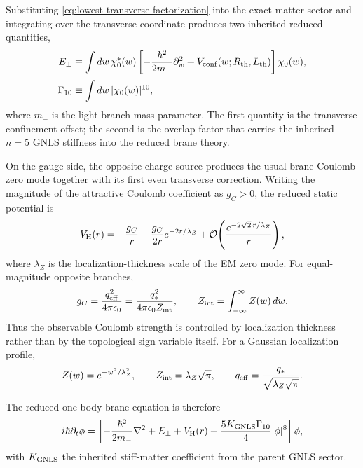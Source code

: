\documentclass[11pt]{article}
\theoremstyle{plain}
\theoremstyle{definition}
\theoremstyle{remark}
\newcommand{\Rth}{R_{\mathrm{th}}}
\newcommand{\Lth}{L_{\mathrm{th}}}
\newcommand{\qeff}{q_{\mathrm{eff}}}
\newcommand{\qstar}{q_*}
\newcommand{\Order}[1]{\mathcal{O}\!\left(#1\right)}
\begin{document}
Substituting \cref{eq:lowest-transverse-factorization} into the exact matter sector and integrating over the transverse coordinate produces two inherited reduced quantities,
\begin{align}
E_\perp
&\equiv
\int dw\,\chi_0^*(w)
\left[-\frac{\hbar^2}{2m_-}\partial_w^2+V_{\rm conf}(w;\Rth,\Lth)\right]\chi_0(w),
\label{eq:Eperp-def}
\\[0.5ex]
\Gamma_{10}
&\equiv \int dw\,|\chi_0(w)|^{10},
\label{eq:Gamma10-def}
\end{align}
where $m_-$ is the light-branch mass parameter. The first quantity is the transverse confinement offset; the second is the overlap factor that carries the inherited $n=5$ GNLS stiffness into the reduced brane theory.

On the gauge side, the opposite-charge source produces the usual brane Coulomb zero mode together with its first even transverse correction. Writing the magnitude of the attractive Coulomb coefficient as $g_C>0$, the reduced static potential is
\begin{equation}
V_{\rm H}(r)
=
-\frac{g_C}{r}
-\frac{g_C}{2r}e^{-2r/\lambda_Z}
+\Order{\frac{e^{-2\sqrt2\,r/\lambda_Z}}{r}},
\label{eq:hydrogenic-potential}
\end{equation}
where $\lambda_Z$ is the localization-thickness scale of the EM zero mode. For equal-magnitude opposite branches,
\begin{equation}
g_C
=
\frac{\qeff^2}{4\pi\epsilon_0}
=
\frac{\qstar^2}{4\pi\epsilon_0 Z_{\rm int}},
\qquad
Z_{\rm int}=\int_{-\infty}^{\infty} Z(w)\,dw.
\label{eq:gC-def}
\end{equation}
Thus the observable Coulomb strength is controlled by localization thickness rather than by the topological sign variable itself. For a Gaussian localization profile,
\begin{equation}
Z(w)=e^{-w^2/\lambda_Z^2},
\qquad
Z_{\rm int}=\lambda_Z\sqrt\pi,
\qquad
\qeff=\frac{\qstar}{\sqrt{\lambda_Z\sqrt\pi}}.
\label{eq:gaussian-localization-law}
\end{equation}

The reduced one-body brane equation is therefore
\begin{equation}
i\hbar\partial_t\phi
=
\left[
-\frac{\hbar^2}{2m_-}\nabla^2
+E_\perp
+V_{\rm H}(r)
+\frac{5K_{\rm GNLS}\Gamma_{10}}{4}|\phi|^8
\right]\phi,
\label{eq:hydrogenic-brane-equation}
\end{equation}
with $K_{\rm GNLS}$ the inherited stiff-matter coefficient from the parent GNLS sector.
\end{document}
